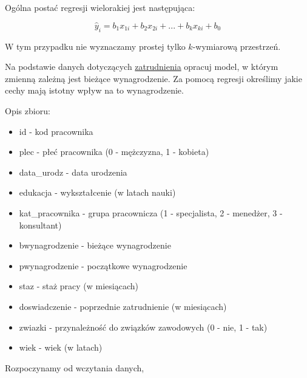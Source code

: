 \documentclass[
]{book}
\newenvironment{Shaded}{\begin{snugshade}}{\end{snugshade}}
\newcommand{\DataTypeTok}[1]{\textcolor[rgb]{0.13,0.29,0.53}{#1}}
\newcommand{\KeywordTok}[1]{\textcolor[rgb]{0.13,0.29,0.53}{\textbf{#1}}}
\newcommand{\NormalTok}[1]{#1}
\newcommand{\OperatorTok}[1]{\textcolor[rgb]{0.81,0.36,0.00}{\textbf{#1}}}
\newcommand{\StringTok}[1]{\textcolor[rgb]{0.31,0.60,0.02}{#1}}
\providecommand{\tightlist}{%
  \setlength{\itemsep}{0pt}\setlength{\parskip}{0pt}}
\begin{document}
Ogólna postać regresji wielorakiej jest następująca:

\[\hat{y}_{i}=b_{1}x_{1i}+b_{2}x_{2i}+...+b_{k}x_{ki}+b_{0}\]

W tym przypadku nie wyznaczamy prostej tylko \(k\)-wymiarową przestrzeń.

Na podstawie danych dotyczących \href{data/pracownicy.xlsx}{zatrudnienia} opracuj model, w którym zmienną zależną jest bieżące wynagrodzenie. Za pomocą regresji określimy jakie cechy mają istotny wpływ na to wynagrodzenie.

Opis zbioru:

\begin{itemize}
\tightlist
\item
  id - kod pracownika
\item
  plec - płeć pracownika (0 - mężczyzna, 1 - kobieta)
\item
  data\_urodz - data urodzenia
\item
  edukacja - wykształcenie (w latach nauki)
\item
  kat\_pracownika - grupa pracownicza (1 - specjalista, 2 - menedżer, 3 - konsultant)
\item
  bwynagrodzenie - bieżące wynagrodzenie
\item
  pwynagrodzenie - początkowe wynagrodzenie
\item
  staz - staż pracy (w miesiącach)
\item
  doswiadczenie - poprzednie zatrudnienie (w miesiącach)
\item
  zwiazki - przynależność do związków zawodowych (0 - nie, 1 - tak)
\item
  wiek - wiek (w latach)
\end{itemize}

Rozpoczynamy od wczytania danych,

\begin{Shaded}
\end{Shaded}
\end{document}
